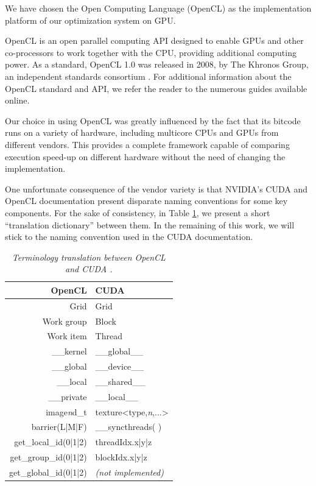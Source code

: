 We have chosen the Open Computing Language (OpenCL) \cite{Stone_OpenCL.A.parallel.programming.standard:2010}
as the implementation platform of our optimization system on GPU.

OpenCL is an open parallel computing API designed to enable GPUs and
other co-processors to work together with the CPU, providing additional
computing power. As a standard, OpenCL 1.0 was released in 2008, by
The Khronos Group, an independent standards consortium \cite{Munshi_The.OpenCL.specification:2009}.
For additional information about the OpenCL standard and API, we refer
the reader to the numerous guides available online.

Our choice in using OpenCL was greatly influenced by the fact that
its bitcode runs on a variety of hardware, including multicore CPUs
and GPUs from different vendors. This provides a complete framework
capable of comparing execution speed-up on different hardware without
the need of changing the implementation. 

One unfortunate consequence of the vendor variety is that NVIDIA's
CUDA \cite{NVIDIA_Compute.Unified.Device.Architecture:2007} and OpenCL
documentation present disparate naming conventions for some key components.
For the sake of consistency, in Table \ref{tab:CUDA-OpenCL-translation},
we present a short ``translation dictionary'' between them. In the
remaining of this work, we will stick to the naming convention used
in the CUDA documentation.

\begin{table}
\caption{\textit{Terminology translation between OpenCL and CUDA \cite{Kloeckner_CUDA.OpenCL.dictionary:2011}.\label{tab:CUDA-OpenCL-translation}}}


\centering

\begin{tabular}{r|l}
\hline 
\textbf{OpenCL} & \textbf{CUDA}\tabularnewline[\doublerulesep]
\hline 
Grid & Grid\tabularnewline
Work group & Block\tabularnewline
Work item & Thread\tabularnewline
\_\_kernel & \_\_global\_\_\tabularnewline
\_\_global & \_\_device\_\_\tabularnewline
\_\_local & \_\_shared\_\_\tabularnewline
\_\_private & \_\_local\_\_\tabularnewline
image\emph{n}d\_t & texture<type,\emph{n},...>\tabularnewline
barrier(L|M|F) & \_\_syncthreads( )\tabularnewline
get\_local\_id(0|1|2) & threadIdx.x|y|z\tabularnewline
get\_group\_id(0|1|2) & blockIdx.x|y|z\tabularnewline
get\_global\_id(0|1|2) & \emph{(not implemented)}\tabularnewline
\hline 
\end{tabular}
\end{table}



